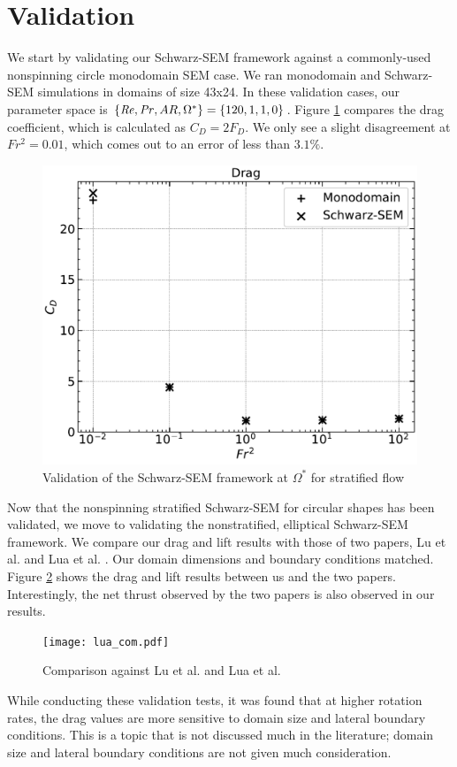 \section{Validation}
\label{section:validation}
We start by validating our Schwarz-SEM framework against a commonly-used nonspinning circle monodomain SEM case. We ran monodomain and Schwarz-SEM simulations in domains of size 43x24. In these validation cases, our parameter space is $\{\mathit{Re}, \mathit{Pr}, AR, \Omega^{\ast}\} = \{120, 1, 1, 0\}$. Figure \ref{fig:nn val} compares the drag coefficient, which is calculated as $C_D = 2F_D$. We only see a slight disagreement at $Fr^2 = 0.01$, which comes out to an error of less than $3.1\%$.  

\begin{figure}
    \centerline{\includegraphics[width=.8\textwidth]{images/dragvalnn.pdf}}
    \caption{Validation of the Schwarz-SEM framework at $\Omega^{\ast}$ for stratified flow}
    \label{fig:nn val}
\end{figure}

Now that the nonspinning stratified Schwarz-SEM for circular shapes has been validated, we move to validating the nonstratified, elliptical Schwarz-SEM framework. We compare our drag and lift results with those of two papers, Lu et al. \cite{lu_flow_2018} and Lua et al. \cite{lua_rotating_2018}. Our domain dimensions and boundary conditions matched. Figure \ref{fig:lua_com} shows the drag and lift results between us and the two papers. Interestingly, the net thrust observed by the two papers is also observed in our results.
\begin{figure}
    \centering
    \texttt{[image: lua\_com.pdf]}
    \caption{Comparison against Lu et al. \cite{lu_flow_2018} and Lua et al. \cite{lua_rotating_2018}}
    \label{fig:lua_com}
\end{figure}
While conducting these validation tests, it was found that at higher rotation rates, the drag values are more sensitive to domain size and lateral boundary conditions. This is a topic that is not discussed much in the literature; domain size and lateral boundary conditions are not given much consideration. 

